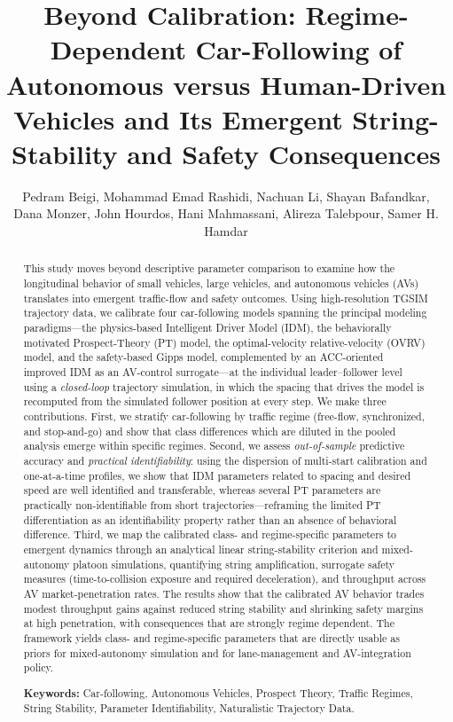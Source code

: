 \documentclass[11pt]{article}
\title{\textbf{Beyond Calibration: Regime-Dependent Car-Following of
Autonomous versus Human-Driven Vehicles and Its Emergent String-Stability
and Safety Consequences}}
\author{Pedram Beigi, Mohammad Emad Rashidi, Nachuan Li, Shayan Bafandkar,\\
Dana Monzer, John Hourdos, Hani Mahmassani, Alireza Talebpour, Samer H. Hamdar}
\date{}
\begin{document}
\linenumbers
\maketitle

\begin{abstract}
\noindent
This study moves beyond descriptive parameter comparison to examine how the
longitudinal behavior of small vehicles, large vehicles, and autonomous vehicles
(AVs) translates into emergent traffic-flow and safety outcomes. Using
high-resolution TGSIM trajectory data, we calibrate four car-following models
spanning the principal modeling paradigms---the physics-based Intelligent Driver
Model (IDM), the behaviorally motivated Prospect-Theory (PT) model, the
optimal-velocity relative-velocity (OVRV) model, and the safety-based Gipps
model, complemented by an ACC-oriented improved IDM as an AV-control
surrogate---at the individual leader--follower level using a \emph{closed-loop}
trajectory simulation, in which the spacing that drives the model is recomputed
from the simulated follower position at every step. We make three contributions. First, we stratify
car-following by traffic regime (free-flow, synchronized, and stop-and-go) and
show that class differences which are diluted in the pooled analysis emerge
within specific regimes. Second, we assess \emph{out-of-sample} predictive
accuracy and \emph{practical identifiability}: using the dispersion of
multi-start calibration and one-at-a-time profiles, we show that IDM parameters
related to spacing and desired speed are well identified and transferable,
whereas several PT parameters are practically non-identifiable from short
trajectories---reframing the limited PT differentiation as an identifiability
property rather than an absence of behavioral difference. Third, we map the
calibrated class- and regime-specific parameters to emergent dynamics through an
analytical linear string-stability criterion and mixed-autonomy platoon
simulations, quantifying string amplification, surrogate safety measures
(time-to-collision exposure and required deceleration), and throughput across AV
market-penetration rates. The results show that the calibrated AV behavior trades
modest throughput gains against reduced string stability and shrinking safety
margins at high penetration, with consequences that are strongly regime
dependent. The framework yields class- and regime-specific parameters that are
directly usable as priors for mixed-autonomy simulation and for lane-management
and AV-integration policy.

\vspace{0.5em}
\noindent\textbf{Keywords:} Car-following, Autonomous Vehicles, Prospect Theory,
Traffic Regimes, String Stability, Parameter Identifiability, Naturalistic
Trajectory Data.
\end{abstract}
\end{document}
